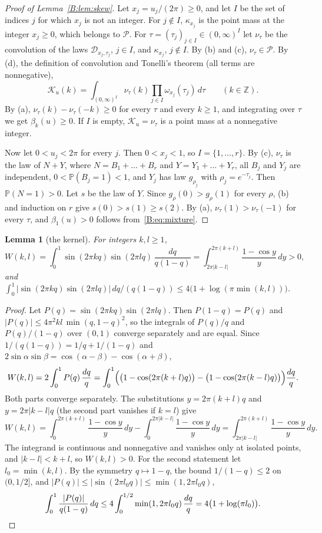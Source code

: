 \documentclass[11pt]{amsart}
\newtheorem{lemma}[theorem]{Lemma}
\theoremstyle{remark}
\numberwithin{equation}{section}
\renewcommand{\P}{\mathbb{P}}
\begin{document}
\begin{proof}[Proof of Lemma~\ref{B:lem:skew}]
Let $x_j=u_j/(2\pi)\ge0$, and let $I$ be the set of indices $j$ for which $x_j$ is not an integer. For $j\notin I$, $\kappa_{x_j}$ is the point mass at the integer $x_j\ge0$, which belongs to $\mathcal P$. For $\tau=(\tau_j)_{j\in I}\in(0,\infty)^I$ let $\nu_\tau$ be the convolution of the laws $\mathcal D_{x_j,\tau_j}$, $j\in I$, and $\kappa_{x_j}$, $j\notin I$. By (b) and (c), $\nu_\tau\in\mathcal P$. By (d), the definition of convolution and Tonelli's theorem (all terms are nonnegative),
\begin{equation}\label{B:eq:mixture}
\mathcal K_u(k)=\int_{(0,\infty)^I}\nu_\tau(k)\prod_{j\in I}\omega_{x_j}(\tau_j)\,d\tau\qquad(k\in\mathbb Z).
\end{equation}
By (a), $\nu_\tau(k)-\nu_\tau(-k)\ge0$ for every $\tau$ and every $k\ge1$, and integrating over $\tau$ we get $\beta_k(u)\ge0$. If $I$ is empty, $\mathcal K_u=\nu_\tau$ is a point mass at a nonnegative integer.

Now let $0<u_j<2\pi$ for every $j$. Then $0<x_j<1$, so $I=\{1,\dots,r\}$. By (c), $\nu_\tau$ is the law of $N+Y$, where $N=B_1+\dots+B_r$ and $Y=Y_1+\dots+Y_r$, all $B_j$ and $Y_j$ are independent, $0<\P(B_j=1)<1$, and $Y_j$ has law $g_{\rho_j}$ with $\rho_j=e^{-\tau_j}$. Then $\P(N=1)>0$. Let $s$ be the law of $Y$. Since $g_\rho(0)>g_\rho(1)$ for every $\rho$, (b) and induction on $r$ give $s(0)>s(1)\ge s(2)$. By (a), $\nu_\tau(1)>\nu_\tau(-1)$ for every $\tau$, and $\beta_1(u)>0$ follows from~\eqref{B:eq:mixture}.
\end{proof}

\begin{lemma}[the kernel]\label{B:lem:kernel}
For integers $k,l\ge1$,
\[
W(k,l)=\int_0^1\sin(2\pi kq)\sin(2\pi lq)\,\frac{dq}{q(1-q)}=\int_{2\pi|k-l|}^{2\pi(k+l)}\frac{1-\cos y}{y}\,dy>0,
\]
and $\int_0^1|\sin(2\pi kq)\sin(2\pi lq)|\,dq/(q(1-q))\le4\bigl(1+\log(\pi\min(k,l))\bigr)$.
\end{lemma}

\begin{proof}
Let $P(q)=\sin(2\pi kq)\sin(2\pi lq)$. Then $P(1-q)=P(q)$ and $|P(q)|\le4\pi^2kl\,\min(q,1-q)^2$, so the integrals of $P(q)/q$ and $P(q)/(1-q)$ over $(0,1)$ converge separately and are equal. Since $1/(q(1-q))=1/q+1/(1-q)$ and $2\sin\alpha\sin\beta=\cos(\alpha-\beta)-\cos(\alpha+\beta)$,
\[
W(k,l)=2\int_0^1P(q)\,\frac{dq}q=\int_0^1\Bigl(\bigl(1-\cos(2\pi(k+l)q)\bigr)-\bigl(1-\cos(2\pi(k-l)q)\bigr)\Bigr)\frac{dq}q.
\]
Both parts converge separately. The substitutions $y=2\pi(k+l)q$ and $y=2\pi|k-l|q$ (the second part vanishes if $k=l$) give
\[
W(k,l)=\int_0^{2\pi(k+l)}\frac{1-\cos y}{y}\,dy-\int_0^{2\pi|k-l|}\frac{1-\cos y}{y}\,dy=\int_{2\pi|k-l|}^{2\pi(k+l)}\frac{1-\cos y}{y}\,dy.
\]
The integrand is continuous and nonnegative and vanishes only at isolated points, and $|k-l|<k+l$, so $W(k,l)>0$. For the second statement let $l_0=\min(k,l)$. By the symmetry $q\mapsto1-q$, the bound $1/(1-q)\le2$ on $(0,1/2]$, and $|P(q)|\le|\sin(2\pi l_0q)|\le\min(1,2\pi l_0q)$,
\[
\int_0^1\frac{|P(q)|}{q(1-q)}\,dq\le4\int_0^{1/2}\min(1,2\pi l_0q)\,\frac{dq}q=4\bigl(1+\log(\pi l_0)\bigr).\qedhere
\]
\end{proof}
\end{document}
